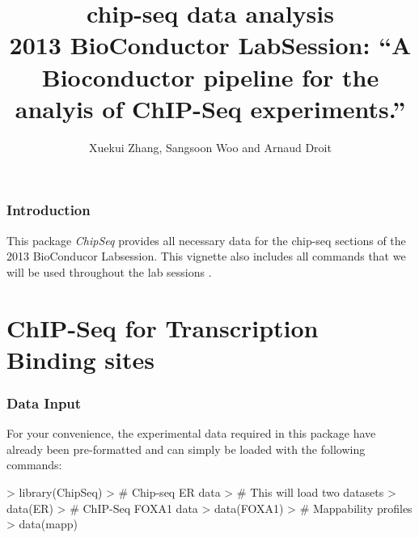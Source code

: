 \documentclass[12pt]{article}
\newcommand{\Rclass}[1]{{\textit{#1}}}
\begin{document}

\newtheorem{Exercise}{Exercise}[section]

\title{chip-seq data analysis \\ 2013 BioConductor LabSession: ``A Bioconductor pipeline for the analyis of ChIP-Seq experiments.''}
\author{Xuekui Zhang, Sangsoon Woo and Arnaud Droit}

\maketitle

\section{Introduction}

This package \Rclass{ChipSeq} provides all necessary data for the chip-seq sections of the 2013 BioConducor Labsession. This vignette also includes all commands that we will be used throughout the lab sessions \cite{Mercier:2011p5429,Zhang:2010p3139}.

\part{ChIP-Seq for Transcription Binding sites}
\section{Data Input}
For your convenience, the experimental data required in this package have already been pre-formatted and can simply be loaded with the following commands:
\begin{Schunk}
\begin{Sinput}
> library(ChipSeq)
> # Chip-seq ER data
> # This will load two datasets
> data(ER)
> # ChIP-Seq FOXA1 data
> data(FOXA1)
> # Mappability profiles
> data(mapp)
\end{Sinput}
\end{Schunk}
\end{document}

